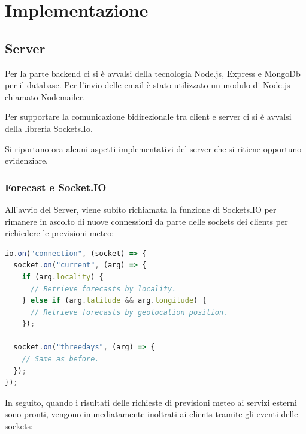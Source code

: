 

\chapter{Implementazione}
\section{Server}
Per la parte backend ci si è avvalsi della tecnologia Node.js, Express e MongoDb per il database. Per l'invio delle email è stato utilizzato un modulo di Node.js chiamato Nodemailer.


Per supportare la comunicazione bidirezionale tra client e server ci si è avvalsi della libreria Sockets.Io.


Si riportano ora alcuni aspetti implementativi del server che si ritiene opportuno evidenziare. 

\subsection{Forecast e Socket.IO}

All'avvio del Server, viene subito richiamata la funzione di Sockets.IO per rimanere in ascolto di nuove connessioni da parte delle sockets dei clients per richiedere le previsioni meteo:

\begin{lstlisting}[language=Javascript]
io.on("connection", (socket) => {
  socket.on("current", (arg) => {
    if (arg.locality) {
      // Retrieve forecasts by locality.
    } else if (arg.latitude && arg.longitude) {
      // Retrieve forecasts by geolocation position.
    });
    
  socket.on("threedays", (arg) => {
    // Same as before.
  });
});
\end{lstlisting}

In seguito, quando i risultati delle richieste di previsioni meteo ai servizi esterni sono pronti, vengono immediatamente inoltrati ai clients tramite gli eventi delle sockets:

